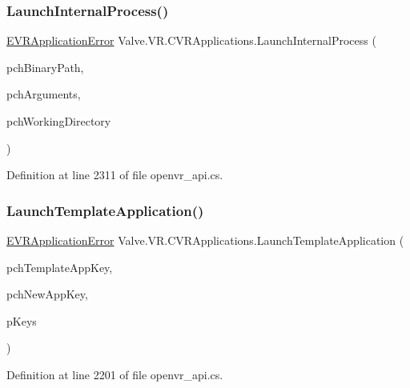 \subsubsection{\texorpdfstring{LaunchInternalProcess()}{LaunchInternalProcess()}}
{\footnotesize\ttfamily \mbox{\hyperlink{namespace_valve_1_1_v_r_a3488adab8a219b579fcee50f4e63a8b6}{E\+V\+R\+Application\+Error}} Valve.\+V\+R.\+C\+V\+R\+Applications.\+Launch\+Internal\+Process (\begin{DoxyParamCaption}\item[{string}]{pch\+Binary\+Path,  }\item[{string}]{pch\+Arguments,  }\item[{string}]{pch\+Working\+Directory }\end{DoxyParamCaption})}



Definition at line 2311 of file openvr\+\_\+api.\+cs.

\mbox{\label{class_valve_1_1_v_r_1_1_c_v_r_applications_a423aa8da44ee6d43044a48592a2fabc1}} 
\subsubsection{\texorpdfstring{LaunchTemplateApplication()}{LaunchTemplateApplication()}}
{\footnotesize\ttfamily \mbox{\hyperlink{namespace_valve_1_1_v_r_a3488adab8a219b579fcee50f4e63a8b6}{E\+V\+R\+Application\+Error}} Valve.\+V\+R.\+C\+V\+R\+Applications.\+Launch\+Template\+Application (\begin{DoxyParamCaption}\item[{string}]{pch\+Template\+App\+Key,  }\item[{string}]{pch\+New\+App\+Key,  }\item[{\mbox{\hyperlink{struct_valve_1_1_v_r_1_1_app_override_keys__t}{App\+Override\+Keys\+\_\+t}} \mbox{[}$\,$\mbox{]}}]{p\+Keys }\end{DoxyParamCaption})}



Definition at line 2201 of file openvr\+\_\+api.\+cs.

\mbox{\label{class_valve_1_1_v_r_1_1_c_v_r_applications_a0cafe190f23f3170b18c68d3ae758d47}} 

